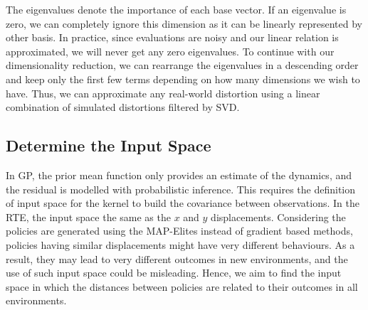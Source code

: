 The eigenvalues denote the importance of each base vector.
If an eigenvalue is zero, we can completely ignore this dimension as it can be linearly represented by other basis.
In practice, since evaluations are noisy and our linear relation is approximated, we will never get any zero eigenvalues. 
To continue with our dimensionality reduction, we can rearrange the eigenvalues in a descending order and keep only the first few terms depending on how many dimensions we wish to have.
Thus, we can approximate any real-world distortion using a linear combination of simulated distortions filtered by SVD.



\subsection{Determine the Input Space}
In GP, the prior mean function only provides an estimate of the dynamics, and the residual is modelled with probabilistic inference.
This requires the definition of input space for the kernel to build the covariance between observations.
In the RTE, the input space the same as the $x$ and $y$ displacements.
Considering the policies are generated using the MAP-Elites instead of gradient based methods, policies having similar displacements might have very different behaviours.
As a result, they may lead to very different outcomes in new environments, and the use of such input space could be misleading.
Hence, we aim to find the input space in which the distances between policies are related to their outcomes in all environments. 

